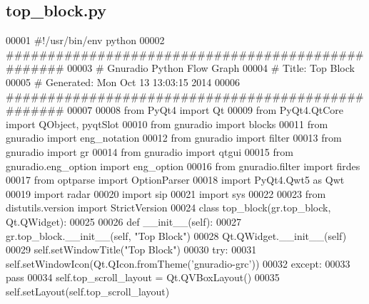 \subsection{top\+\_\+block.\+py}
\label{top__block_8py_source}

\begin{DoxyCode}
00001 \textcolor{comment}{#!/usr/bin/env python}
00002 \textcolor{comment}{##################################################}
00003 \textcolor{comment}{# Gnuradio Python Flow Graph}
00004 \textcolor{comment}{# Title: Top Block}
00005 \textcolor{comment}{# Generated: Mon Oct 13 13:03:15 2014}
00006 \textcolor{comment}{##################################################}
00007 
00008 \textcolor{keyword}{from} PyQt4 \textcolor{keyword}{import} Qt
00009 \textcolor{keyword}{from} PyQt4.QtCore \textcolor{keyword}{import} QObject, pyqtSlot
00010 \textcolor{keyword}{from} gnuradio \textcolor{keyword}{import} blocks
00011 \textcolor{keyword}{from} gnuradio \textcolor{keyword}{import} eng\_notation
00012 \textcolor{keyword}{from} gnuradio \textcolor{keyword}{import} filter
00013 \textcolor{keyword}{from} gnuradio \textcolor{keyword}{import} gr
00014 \textcolor{keyword}{from} gnuradio \textcolor{keyword}{import} qtgui
00015 \textcolor{keyword}{from} gnuradio.eng\_option \textcolor{keyword}{import} eng\_option
00016 \textcolor{keyword}{from} gnuradio.filter \textcolor{keyword}{import} firdes
00017 \textcolor{keyword}{from} optparse \textcolor{keyword}{import} OptionParser
00018 \textcolor{keyword}{import} PyQt4.Qwt5 \textcolor{keyword}{as} Qwt
00019 \textcolor{keyword}{import} radar
00020 \textcolor{keyword}{import} sip
00021 \textcolor{keyword}{import} sys
00022 
00023 \textcolor{keyword}{from} distutils.version \textcolor{keyword}{import} StrictVersion
00024 \textcolor{keyword}{class }top_block(gr.top\_block, Qt.QWidget):
00025 
00026     \textcolor{keyword}{def }__init__(self):
00027         gr.top\_block.\_\_init\_\_(self, \textcolor{stringliteral}{"Top Block"})
00028         Qt.QWidget.\_\_init\_\_(self)
00029         self.setWindowTitle(\textcolor{stringliteral}{"Top Block"})
00030         \textcolor{keywordflow}{try}:
00031              self.setWindowIcon(Qt.QIcon.fromTheme(\textcolor{stringliteral}{'gnuradio-grc'}))
00032         \textcolor{keywordflow}{except}:
00033              \textcolor{keywordflow}{pass}
00034         self.top_scroll_layout = Qt.QVBoxLayout()
00035         self.setLayout(self.top_scroll_layout)

\end{DoxyCode}
